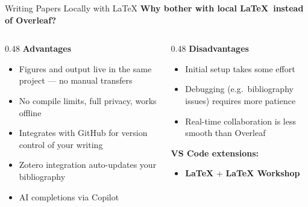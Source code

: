 \documentclass[13pt, aspectratio=169]{beamer}
\begin{document}
\begin{frame}{Writing Papers Locally with \LaTeX}
    \textbf{Why bother with local \LaTeX\ instead of Overleaf?}

    \begin{columns}
        \begin{column}{0.48\textwidth}
            \textbf{Advantages}
            \begin{itemize}
                \item Figures and output live in the same project --- no manual transfers
                \item No compile limits, full privacy, works offline
                \item Integrates with GitHub for version control of your writing
                \item Zotero integration auto-updates your bibliography
                \item AI completions via Copilot
            \end{itemize}
        \end{column}
        \begin{column}{0.48\textwidth}
            \textbf{Disadvantages}
            \begin{itemize}
                \item Initial setup takes some effort
                \item Debugging (e.g.\ bibliography issues) requires more patience
                \item Real-time collaboration is less smooth than Overleaf
            \end{itemize}
            \vspace{0.5em}
            \textbf{VS Code extensions:}
            \begin{itemize}
                \item \textbf{LaTeX} + \textbf{LaTeX Workshop}
            \end{itemize}
        \end{column}
    \end{columns}
\end{frame}

\end{document}
